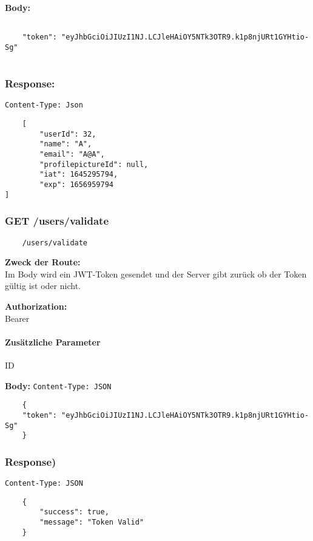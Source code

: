 \textbf{Body:}

\begin{lstlisting}

    "token": "eyJhbGciOiJIUzI1NJ.LCJleHAiOY5NTk3OTR9.k1p8njURt1GYHtio-Sg"
    
\end{lstlisting}

\subsubsection{Response:}

\lstinline{Content-Type: Json}
\begin{lstlisting}
    [
        "userId": 32,
        "name": "A",
        "email": "A@A",
        "profilepictureId": null,
        "iat": 1645295794,
        "exp": 1656959794
]
\end{lstlisting}

\pagebreak

\subsubsection{GET /users/validate}

\begin{lstlisting}
    /users/validate
\end{lstlisting}

\textbf{Zweck der Route:} \\
Im Body wird ein JWT-Token gesendet und der Server gibt zurück ob der Token
gültig ist oder nicht.

\textbf{Authorization:} \\
Bearer

\paragraph{Zusätzliche Parameter}
ID

\textbf{Body:}
\lstinline{Content-Type: JSON}
\begin{lstlisting}
    {
    "token": "eyJhbGciOiJIUzI1NJ.LCJleHAiOY5NTk3OTR9.k1p8njURt1GYHtio-Sg"
    }
\end{lstlisting}


\subsubsection{Response)}

\lstinline{Content-Type: JSON}
\begin{lstlisting}
    {
        "success": true,
        "message": "Token Valid"
    }
\end{lstlisting}

